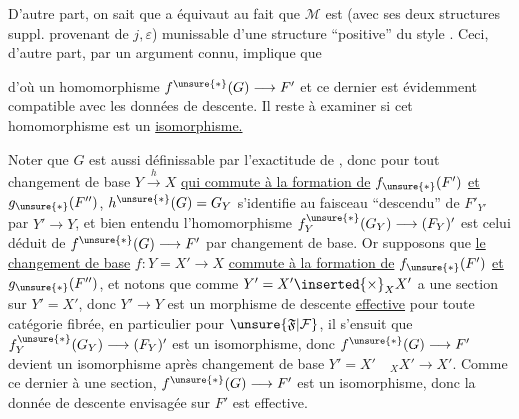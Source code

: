 
D'autre part, on sait que a équivaut au fait que $\mathcal M$ est (avec ses deux structures suppl. provenant de $j,\varepsilon$) munissable d'une structure ``positive'' du style . Ceci, d'autre part, par un argument connu, implique que



d'où un homomorphisme $f^{\unsure{*}}(G)\longrightarrow F'$ et ce dernier est évidemment compatible avec les données de descente. Il reste à examiner si cet homomorphisme est un \uline{isomorphisme.}


Noter que $G$ est aussi définissable par l'exactitude de
,
donc pour tout changement de base $Y\xrightarrow{h}X$ \uline{qui commute à la formation de} $f_{\unsure{*}}(F')$ \uline{et} $g_{\unsure{*}}(F'')$, $h^{\unsure{*}}(G)=G_Y$ s'identifie au faisceau ``descendu'' de $F'_{Y'}$ par $Y'\longrightarrow Y$, et bien entendu l'homomorphisme $f_Y^{\unsure{*}}(G_Y)\longrightarrow(F_Y)'$ est celui déduit de $f^{\unsure{*}}(G)\longrightarrow F'$ par changement de base. Or supposons que \uline{le changement de base} $f:Y=X'\longrightarrow X$ \uline{commute à la formation de} $f_{\unsure{*}}(F')$ \uline{et} $g_{\unsure{*}}(F'')$, et notons que comme $Y'=X'\inserted{\times}_X X'$ a une section sur $Y'=X'$, donc $Y'\longrightarrow Y$ est un morphisme de descente \uline{effective} pour toute catégorie fibrée, en particulier pour $\unsure{\mathfrak F|\mathcal F}$, il s'ensuit que $f_Y^{\unsure{*}}(G_Y)\longrightarrow(F_Y)'$ est un isomorphisme, donc $f^{\unsure{*}}(G)\longrightarrow F'$ devient un isomorphisme après changement de base $Y'=X'\quad{}_X X'\longrightarrow X'$. Comme ce dernier à une section, $f^{\unsure{*}}(G)\longrightarrow F'$ est un isomorphisme, donc la donnée de descente envisagée sur $F'$ est effective.


